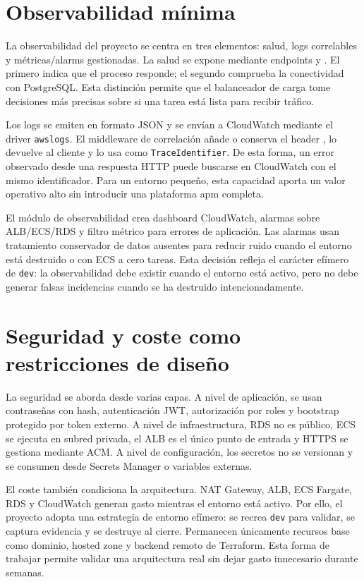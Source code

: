 \section{Observabilidad mínima}
\label{sec:marco-observabilidad}

La observabilidad del proyecto se centra en tres elementos: salud, logs correlables y métricas/alarms gestionadas. La salud se expone mediante endpoints  y . El primero indica que el proceso responde; el segundo comprueba la conectividad con PostgreSQL. Esta distinción permite que el balanceador de carga tome decisiones más precisas sobre si una tarea está lista para recibir tráfico.

Los logs se emiten en formato JSON y se envían a CloudWatch mediante el driver \texttt{awslogs}. El middleware de correlación añade o conserva el header , lo devuelve al cliente y lo usa como \texttt{TraceIdentifier}. De esta forma, un error observado desde una respuesta HTTP puede buscarse en CloudWatch con el mismo identificador. Para un entorno pequeño, esta capacidad aporta un valor operativo alto sin introducir una plataforma \acrshort{apm} completa.

El módulo de observabilidad crea dashboard CloudWatch, alarmas sobre ALB/ECS/RDS y filtro métrico para errores de aplicación. Las alarmas usan tratamiento conservador de datos ausentes para reducir ruido cuando el entorno está destruido o con ECS a cero tareas. Esta decisión refleja el carácter efímero de \texttt{dev}: la observabilidad debe existir cuando el entorno está activo, pero no debe generar falsas incidencias cuando se ha destruido intencionadamente.

\section{Seguridad y coste como restricciones de diseño}
\label{sec:marco-seguridad-coste}

La seguridad se aborda desde varias capas. A nivel de aplicación, se usan contraseñas con hash, autenticación JWT, autorización por roles y bootstrap protegido por token externo. A nivel de infraestructura, RDS no es público, ECS se ejecuta en subred privada, el ALB es el único punto de entrada y HTTPS se gestiona mediante ACM. A nivel de configuración, los secretos no se versionan y se consumen desde Secrets Manager o variables externas.

El coste también condiciona la arquitectura. NAT Gateway, ALB, ECS Fargate, RDS y CloudWatch generan gasto mientras el entorno está activo. Por ello, el proyecto adopta una estrategia de entorno efímero: se recrea \texttt{dev} para validar, se captura evidencia y se destruye al cierre. Permanecen únicamente recursos base como dominio, hosted zone y backend remoto de Terraform. Esta forma de trabajar permite validar una arquitectura real sin dejar gasto innecesario durante semanas.

